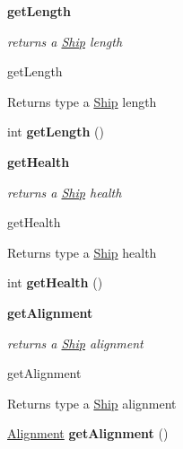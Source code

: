 \begin{Indent}{\bf get\+Length}\par
{\em returns a \hyperlink{classbattleship_1_1ships_1_1Ship}{Ship} length

get\+Length

\begin{DoxyReturn}{Returns}
type a \hyperlink{classbattleship_1_1ships_1_1Ship}{Ship} length 
\end{DoxyReturn}
}\begin{DoxyCompactItemize}
\item 
\hypertarget{classbattleship_1_1ships_1_1Ship_a1e28e6201d730b7761c813f747165b97}{}int {\bfseries get\+Length} ()\label{classbattleship_1_1ships_1_1Ship_a1e28e6201d730b7761c813f747165b97}

\end{DoxyCompactItemize}
\end{Indent}
\begin{Indent}{\bf get\+Health}\par
{\em returns a \hyperlink{classbattleship_1_1ships_1_1Ship}{Ship} health

get\+Health

\begin{DoxyReturn}{Returns}
type a \hyperlink{classbattleship_1_1ships_1_1Ship}{Ship} health 
\end{DoxyReturn}
}\begin{DoxyCompactItemize}
\item 
\hypertarget{classbattleship_1_1ships_1_1Ship_ace5f14e904ccfaad8a80b566ff5a7a20}{}int {\bfseries get\+Health} ()\label{classbattleship_1_1ships_1_1Ship_ace5f14e904ccfaad8a80b566ff5a7a20}

\end{DoxyCompactItemize}
\end{Indent}
\begin{Indent}{\bf get\+Alignment}\par
{\em returns a \hyperlink{classbattleship_1_1ships_1_1Ship}{Ship} alignment

get\+Alignment

\begin{DoxyReturn}{Returns}
type a \hyperlink{classbattleship_1_1ships_1_1Ship}{Ship} alignment 
\end{DoxyReturn}
}\begin{DoxyCompactItemize}
\item 
\hypertarget{classbattleship_1_1ships_1_1Ship_aebcb952263283228b77c3f68638f23f9}{}\hyperlink{enumbattleship_1_1ships_1_1Alignment}{Alignment} {\bfseries get\+Alignment} ()\label{classbattleship_1_1ships_1_1Ship_aebcb952263283228b77c3f68638f23f9}

\end{DoxyCompactItemize}
\end{Indent}
